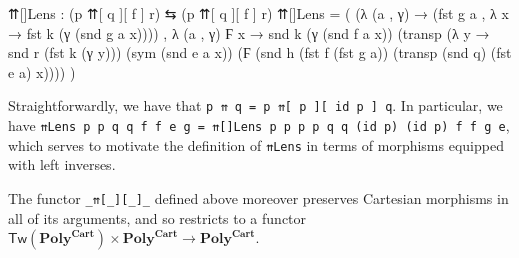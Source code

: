 \documentclass[
  11pt,
  oneside,
  article]{memoir}
\newenvironment{Shaded}{}{}
\newcommand{\NormalTok}[1]{#1}
\newcommand{\OtherTok}[1]{\textcolor[rgb]{0.00,0.44,0.13}{#1}}
\theoremstyle{definition}
\theoremstyle{plain}
\newcommand{\0}{\textsf{0}}
\newcommand{\1}{\tn{\textsf{1}}}
\begin{document}
\begin{Shaded}
\begin{Highlighting}[]
\NormalTok{    ⇈[]Lens }\OtherTok{:} \OtherTok{(}\NormalTok{p ⇈[ q ][ f ] r}\OtherTok{)}\NormalTok{ ⇆ }\OtherTok{(}\NormalTok{p\textquotesingle{} ⇈[ q\textquotesingle{} ][ f\textquotesingle{} ] r\textquotesingle{}}\OtherTok{)}
\NormalTok{    ⇈[]Lens }\OtherTok{=} 
        \OtherTok{(} \OtherTok{(λ} \OtherTok{(}\NormalTok{a , γ}\OtherTok{)} \OtherTok{→} \OtherTok{(}\NormalTok{fst g a , }\OtherTok{λ}\NormalTok{ x }\OtherTok{→}\NormalTok{ fst k }\OtherTok{(}\NormalTok{γ }\OtherTok{(}\NormalTok{snd g a x}\OtherTok{))))} 
\NormalTok{        , }\OtherTok{λ} \OtherTok{(}\NormalTok{a , γ}\OtherTok{)}\NormalTok{ Ϝ x }\OtherTok{→}
\NormalTok{            snd k }\OtherTok{(}\NormalTok{γ }\OtherTok{(}\NormalTok{snd f a x}\OtherTok{))} 
               \OtherTok{(}\NormalTok{transp }\OtherTok{(λ}\NormalTok{ y }\OtherTok{→}\NormalTok{ snd r\textquotesingle{} }\OtherTok{(}\NormalTok{fst k }\OtherTok{(}\NormalTok{γ y}\OtherTok{)))} 
                       \OtherTok{(}\NormalTok{sym }\OtherTok{(}\NormalTok{snd e a x}\OtherTok{))} 
                       \OtherTok{(}\NormalTok{Ϝ }\OtherTok{(}\NormalTok{snd h }\OtherTok{(}\NormalTok{fst f\textquotesingle{} }\OtherTok{(}\NormalTok{fst g a}\OtherTok{))} 
                              \OtherTok{(}\NormalTok{transp }\OtherTok{(}\NormalTok{snd q}\OtherTok{)} \OtherTok{(}\NormalTok{fst e a}\OtherTok{)}\NormalTok{ x}\OtherTok{))))} \OtherTok{)}
\end{Highlighting}
\end{Shaded}

Straightforwardly, we have that
\texttt{p\ ⇈\ q\ =\ p\ ⇈{[}\ p\ {]}{[}\ id\ p\ {]}\ q}. In particular,
we have
\texttt{⇈Lens\ p\ p\textquotesingle{}\ q\ q\textquotesingle{}\ f\ f\textquotesingle{}\ e\ g\ =\ ⇈{[}{]}Lens\ p\ p\textquotesingle{}\ p\ p\textquotesingle{}\ q\ q\textquotesingle{}\ (id\ p)\ (id\ p\textquotesingle{})\ f\ f\textquotesingle{}\ g\ e},
which serves to motivate the definition of \texttt{⇈Lens} in terms of
morphisms equipped with left inverses.

The functor \texttt{\_⇈{[}\_{]}{[}\_{]}\_} defined above moreover
preserves Cartesian morphisms in all of its arguments, and so restricts
to a functor
\(\mathsf{Tw}(\mathbf{Poly}^{\mathbf{Cart}}) \times \mathbf{Poly}^\mathbf{Cart} \to \mathbf{Poly}^\mathbf{Cart}\).
\end{document}
